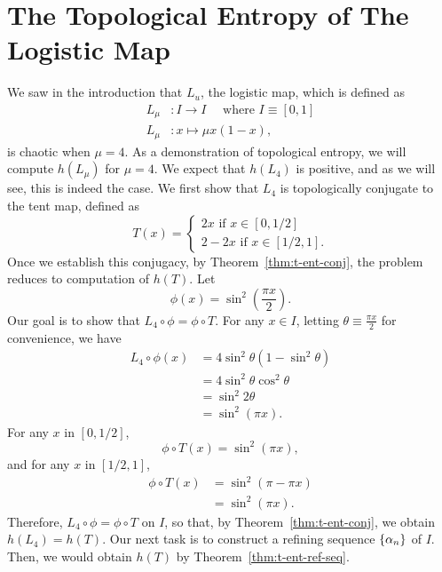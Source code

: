 \documentclass[12pt,twoside,draft]{book}
\begin{document}
\section{The Topological Entropy of The Logistic Map}
We saw in the introduction that $L_u$, the logistic map, which is defined as
\begin{align*}
  L_\mu&: I \to I \quad\mbox{ where } I \equiv [0,1] \\
  L_\mu&: x \mapsto \mu x (1-x),
\end{align*}
is chaotic when $\mu = 4$.
As a demonstration of topological entropy, we will compute $h(L_\mu)$ for $\mu = 4$.
We expect that $h(L_4)$ is positive, and as we will see, this is indeed the case. 
We first show that $L_4$ is topologically conjugate to the tent map, defined as
\begin{equation*}
  T(x) = 
  \begin{cases}
    2x \mbox{ if } x \in [0,1/2] \\
    2 - 2x \mbox{ if } x \in [1/2,1].
  \end{cases}
\end{equation*}
Once we establish this conjugacy, by Theorem~\ref{thm:t-ent-conj}, the problem reduces to computation of $h(T)$.
Let
\begin{equation*}
  \phi(x) = \sin^2(\frac{\pi x}{2}).
\end{equation*}
Our goal is to show that $L_4 \circ \phi = \phi \circ T$.
For any $x \in I$, letting $\theta \equiv \frac{\pi x}{2}$ for convenience, we have
\begin{align*}
   L_4 \circ \phi(x)
   &= 4\sin^2\theta(1 - \sin^2\theta) \\
   &= 4\sin^2\theta \cos^2\theta \\
   &= \sin^2 2\theta \\
   &= \sin^2 (\pi x).
\end{align*}
For any $x$ in $[0,1/2]$,
\begin{equation*}
  \phi \circ T(x)
  = \sin^2(\pi x),
\end{equation*}
and for any $x$ in $[1/2,1]$,
\begin{align*}
  \phi \circ T(x)
  &= \sin^2(\pi - \pi x) \\
  &= \sin^2(\pi x).
\end{align*}
Therefore, $L_4 \circ \phi = \phi \circ T$ on $I$, so that, by Theorem~\ref{thm:t-ent-conj}, we obtain $h(L_4) = h(T)$.
Our next task is to construct a refining sequence $\left \{ \alpha_n \right \}$ of $I$.
Then, we would obtain $h(T)$ by Theorem~\ref{thm:t-ent-ref-seq}.
\end{document}
